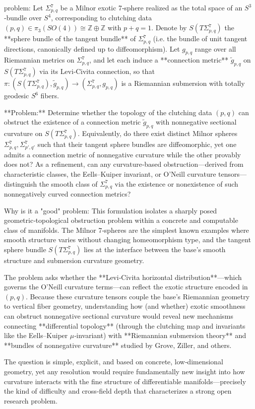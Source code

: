 problem:  
Let $\Sigma_{p,q}^7$ be a Milnor exotic 7‑sphere realized as the total space of an $S^3$‑bundle over $S^4$, corresponding to clutching data $(p,q)\in\pi_3(SO(4))\cong\mathbb{Z}\oplus\mathbb{Z}$ with $p+q=1$.  
Denote by $S(T\Sigma_{p,q}^7)$ the **sphere bundle of the tangent bundle** of $\Sigma_{p,q}^7$ (i.e. the bundle of unit tangent directions, canonically defined up to diffeomorphism).  
Let $g_{p,q}$ range over all Riemannian metrics on $\Sigma_{p,q}^7$, and let each induce a **connection metric** $\tilde g_{p,q}$ on $S(T\Sigma_{p,q}^7)$ via its Levi‑Civita connection, so that $\pi:(S(T\Sigma_{p,q}^7),\tilde g_{p,q})\to(\Sigma_{p,q}^7,g_{p,q})$ is a Riemannian submersion with totally geodesic $S^6$ fibers.  

**Problem:**  
Determine whether the topology of the clutching data $(p,q)$ can obstruct the existence of a connection metric $\tilde g_{p,q}$ with nonnegative sectional curvature on $S(T\Sigma_{p,q}^7)$.  
Equivalently, do there exist distinct Milnor spheres $\Sigma_{p,q}^7,\Sigma_{p',q'}^7$ such that their tangent sphere bundles are diffeomorphic, yet one admits a connection metric of nonnegative curvature while the other provably does not?  
As a refinement, can any curvature‑based obstruction—derived from characteristic classes, the Eells–Kuiper invariant, or O’Neill curvature tensors—distinguish the smooth class of $\Sigma_{p,q}^7$ via the existence or nonexistence of such nonnegatively curved connection metrics?

Why is it a "good" problem:  
This formulation isolates a sharply posed geometric‑topological obstruction problem within a concrete and computable class of manifolds. The Milnor 7‑spheres are the simplest known examples where smooth structure varies without changing homeomorphism type, and the tangent sphere bundle $S(T\Sigma_{p,q}^7)$ lies at the interface between the base’s smooth structure and submersion curvature geometry.  

The problem asks whether the **Levi‑Civita horizontal distribution**—which governs the O’Neill curvature terms—can reflect the exotic structure encoded in $(p,q)$. Because these curvature tensors couple the base’s Riemannian geometry to vertical fiber geometry, understanding how (and whether) exotic smoothness can obstruct nonnegative sectional curvature would reveal new mechanisms connecting **differential topology** (through the clutching map and invariants like the Eells–Kuiper $\mu$‑invariant) with **Riemannian submersion theory** and **bundles of nonnegative curvature** studied by Grove, Ziller, and others.  

The question is simple, explicit, and based on concrete, low‑dimensional geometry, yet any resolution would require fundamentally new insight into how curvature interacts with the fine structure of differentiable manifolds—precisely the kind of difficulty and cross‑field depth that characterizes a strong open research problem.